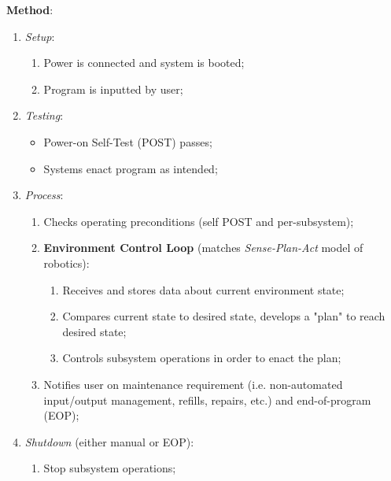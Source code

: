 \documentclass{../tex/report}
\begin{document}
\textbf{Method}:
\begin{enumerate}
    \item \textit{Setup}:
    \begin{enumerate}
        \item Power is connected and system is booted;
        \item Program is inputted by user;
    \end{enumerate}
    \item \textit{Testing}:
    \begin{itemize}
        \item Power-on Self-Test (POST) passes;
        \item Systems enact program as intended;
    \end{itemize}
    \item \textit{Process}:
    \begin{enumerate}
        \item Checks operating preconditions (self POST and per-subsystem);
        \item \textbf{Environment Control Loop} (matches \textit{Sense-Plan-Act} model of robotics):
        \begin{enumerate}
            \item Receives and stores data about current environment state;
            \item Compares current state to desired state, develops a "plan" to reach desired state;
            \item Controls subsystem operations in order to enact the plan;
        \end{enumerate}
        \item Notifies user on maintenance requirement (i.e. non-automated input/output management, refills, repairs, etc.) and end-of-program (EOP);
    \end{enumerate}
    \item \textit{Shutdown} (either manual or EOP):
    \begin{enumerate}
        \item Stop subsystem operations;
    \end{enumerate}
\end{enumerate}
\end{document}
